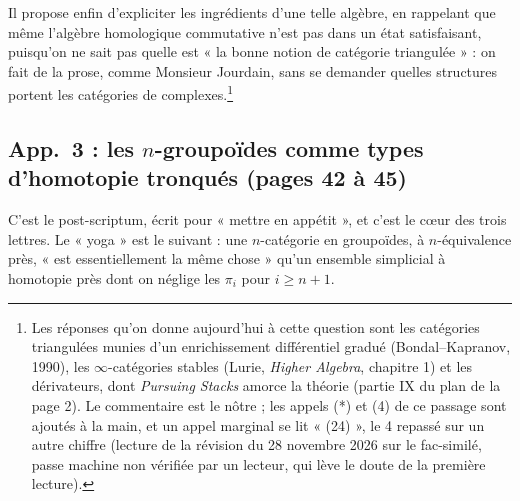 \documentclass[11pt,a4paper]{article}
\begin{document}
Il propose enfin d'expliciter les ingrédients d'une telle algèbre, en
rappelant que même l'algèbre homologique commutative n'est pas dans un état
satisfaisant, puisqu'on ne sait pas quelle est « la bonne notion de catégorie
triangulée » : on fait de la prose, comme Monsieur Jourdain, sans se
demander quelles structures portent les catégories de complexes.\footnote{Les
réponses qu'on donne aujourd'hui à cette question sont les catégories
triangulées munies d'un enrichissement différentiel gradué (Bondal--Kapranov,
1990), les $\infty$-catégories stables (Lurie, \emph{Higher Algebra},
chapitre 1) et les dérivateurs, dont \emph{Pursuing Stacks} amorce la
théorie (partie IX du plan de la page 2). Le commentaire est le nôtre ; les
appels (*) et (4) de ce passage sont ajoutés à la main, et un appel marginal
se lit « (24) », le 4 repassé sur un autre chiffre (lecture de la révision du
28 novembre 2026 sur le fac-similé, passe machine non vérifiée par un lecteur,
qui lève le doute de la première lecture).}

\subsection*{App.~3 : les $n$-groupoïdes comme types d'homotopie tronqués (pages 42 à 45)}

C'est le post-scriptum, écrit pour « mettre en appétit », et c'est le cœur
des trois lettres. Le « yoga » est le suivant : une $n$-catégorie en
groupoïdes, à $n$-équivalence près, « est essentiellement la même chose »
qu'un ensemble simplicial à homotopie près dont on néglige les $\pi_i$ pour
$i \geqslant n+1$.
\end{document}
